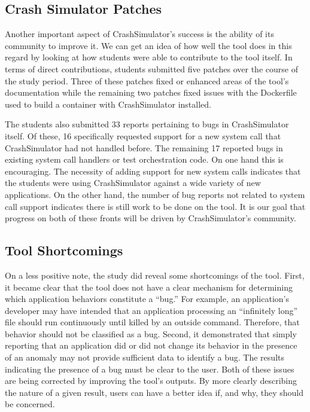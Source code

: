 \subsection{Crash Simulator Patches}
\label{subsec:crashsim-patches}

Another important aspect of CrashSimulator's success is the ability of its
community to improve it.
We can get an idea of how well the tool does in this regard by looking at how
students were able to contribute to the tool itself.
In terms of direct contributions, students submitted five patches over the
course of the study period.  Three of these patches fixed or enhanced areas of
the tool's documentation while the remaining two patches fixed issues with the
Dockerfile used to build a container with CrashSimulator installed.

The students also submitted 33 reports pertaining to bugs in CrashSimulator
itself.  Of these, 16 specifically requested support for a new system call that
CrashSimulator had not handled before.  The remaining 17 reported bugs in
existing system call handlers or test orchestration code.
On one hand this is encouraging.  The necessity of adding
support for new system calls
indicates that the students were
using CrashSimulator against a wide variety of new applications.
On the other hand, the number of bug reports not related to system call support
indicates there is still work to be done on the tool.
It is our goal that progress on both of these fronts will be driven by
CrashSimulator's community.

\subsection{Tool Shortcomings}
\label{subsec:tool-shortcomings}
On a less positive note,
the study did reveal
some shortcomings
of the tool.
First,
it became clear that the tool
does not have a clear mechanism
for determining
which application behaviors constitute a ``bug.''
For example, an application's developer
may have intended that an application processing an ``infinitely long'' file should run continuously
until killed by an outside command.
Therefore, that behavior should not be classified as a bug.
Second,
it demonstrated that
simply reporting that an application did or did not change its behavior
in the presence of an anomaly may not provide sufficient data to identify a bug. The results indicating the presence of a bug must be clear to the user.
Both of these issues are being corrected
by improving the tool's outputs.
By more clearly describing
the nature of a given result,
users can have a better idea
if,
and why,
they should be concerned.


